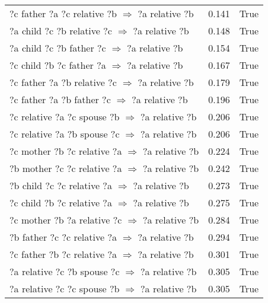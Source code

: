 \begin{longtable}{lrl}
  ?c  father  ?a  ?c  relative  ?b   $\Rightarrow$ ?a  relative  ?b &           0.141 &                     True \\
   ?a  child  ?c  ?b  relative  ?c   $\Rightarrow$ ?a  relative  ?b &           0.148 &                     True \\
     ?a  child  ?c  ?b  father  ?c   $\Rightarrow$ ?a  relative  ?b &           0.154 &                     True \\
     ?c  child  ?b  ?c  father  ?a   $\Rightarrow$ ?a  relative  ?b &           0.167 &                     True \\
  ?c  father  ?a  ?b  relative  ?c   $\Rightarrow$ ?a  relative  ?b &           0.179 &                     True \\
    ?c  father  ?a  ?b  father  ?c   $\Rightarrow$ ?a  relative  ?b &           0.196 &                     True \\
  ?c  relative  ?a  ?c  spouse  ?b   $\Rightarrow$ ?a  relative  ?b &           0.206 &                     True \\
  ?c  relative  ?a  ?b  spouse  ?c   $\Rightarrow$ ?a  relative  ?b &           0.206 &                     True \\
  ?c  mother  ?b  ?c  relative  ?a   $\Rightarrow$ ?a  relative  ?b &           0.224 &                     True \\
  ?b  mother  ?c  ?c  relative  ?a   $\Rightarrow$ ?a  relative  ?b &           0.242 &                     True \\
   ?b  child  ?c  ?c  relative  ?a   $\Rightarrow$ ?a  relative  ?b &           0.273 &                     True \\
   ?c  child  ?b  ?c  relative  ?a   $\Rightarrow$ ?a  relative  ?b &           0.275 &                     True \\
  ?c  mother  ?b  ?a  relative  ?c   $\Rightarrow$ ?a  relative  ?b &           0.284 &                     True \\
  ?b  father  ?c  ?c  relative  ?a   $\Rightarrow$ ?a  relative  ?b &           0.294 &                     True \\
  ?c  father  ?b  ?c  relative  ?a   $\Rightarrow$ ?a  relative  ?b &           0.301 &                     True \\
  ?a  relative  ?c  ?b  spouse  ?c   $\Rightarrow$ ?a  relative  ?b &           0.305 &                     True \\
  ?a  relative  ?c  ?c  spouse  ?b   $\Rightarrow$ ?a  relative  ?b &           0.305 &                     True \\

\end{longtable}

